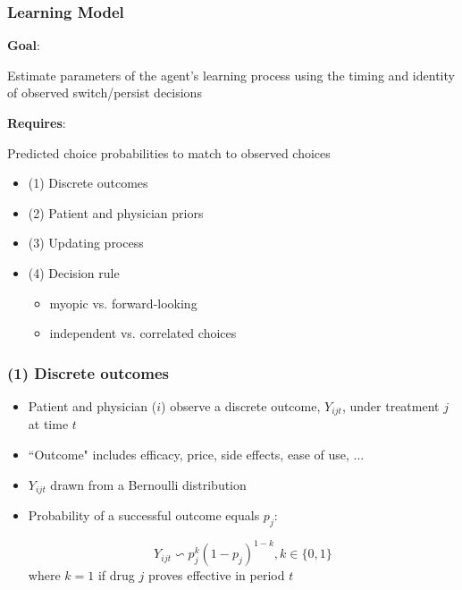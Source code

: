 \documentclass[xcolor=pdftex,dvipsnames,table,mathserif,aspectratio=169]{beamer}
\begin{document}
\begin{frame}
\frametitle{Learning Model}

\textbf{Goal}:

Estimate parameters of the agent's learning process using the timing and
identity of observed switch/persist decisions

\textbf{Requires}:

Predicted choice probabilities to match to observed choices

\begin{itemize}
\item (1) Discrete outcomes

\item (2) Patient and physician priors

\item (3) Updating process

\item (4) Decision rule

\begin{itemize}
\item myopic vs. forward-looking

\item independent vs. correlated choices
\end{itemize}
\end{itemize}
\end{frame}

\begin{frame}
\frametitle{(1) Discrete outcomes}

\begin{itemize}
\item Patient and physician ($i$) observe a discrete outcome, $Y_{ijt}$,
under treatment $j$ at time $t$

\item ``Outcome" includes efficacy, price, side effects, ease of use, ... 
\pause

\item $Y_{ijt}$ drawn from a Bernoulli distribution

\item Probability of a successful outcome equals $p_{j}$:

\[
Y_{ijt}\backsim p_{j}^{k}(1-p_{j})^{1-k},k\in \{0,1\}
\]
where $k=1$ if drug $j$ proves effective in period $t$
\end{itemize}
\end{frame}

\end{document}
